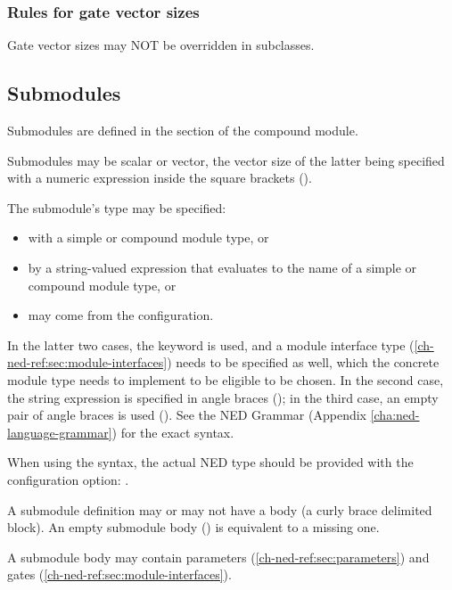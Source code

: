 \subsubsection{Rules for gate vector sizes}

Gate vector sizes may NOT be overridden in subclasses.



\subsection{Submodules}
\label{ch-ned-ref:sec:submodules}

Submodules are defined in the  section of the compound module.

Submodules may be scalar or vector, the vector size of the latter being
specified with a numeric expression inside the square brackets (\ttt{[...]}).

The submodule's type may be specified:

\begin{itemize}
  \item with a simple or compound module type, or
  \item by a string-valued expression that evaluates to the name of a
        simple or compound module type, or
  \item may come from the configuration.
\end{itemize}

In the latter two cases, the  keyword is used, and a
module interface type (\ref{ch-ned-ref:sec:module-interfaces})
needs to be specified as well, which the concrete module type needs
to implement to be eligible to be chosen. In the second case, the
string expression is specified in angle braces (); in the
third case, an empty pair of angle braces is used (\ttt{<>}).
See the NED Grammar (Appendix \ref{cha:ned-language-grammar}) for the
exact syntax.

\begin{note}
    When using the \ttt{<>} syntax, the actual NED type should be
    provided with the  configuration option:
    .
\end{note}

A submodule definition may or may not have a body (a curly brace
delimited block). An empty submodule body (\ttt{\{ \}}) is equivalent
to a missing one.

A submodule body may contain parameters (\ref{ch-ned-ref:sec:parameters})
and gates (\ref{ch-ned-ref:sec:module-interfaces}).

